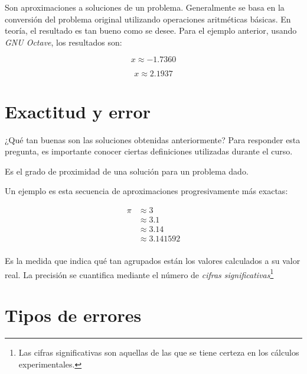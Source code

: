 Son aproximaciones a soluciones de un problema. Generalmente se basa en
la conversión del problema original utilizando operaciones aritméticas
básicas. En teoría, el resultado es tan bueno como se desee. Para el
ejemplo anterior, usando \emph{GNU Octave}, los resultados son:

\begin{equation*}{
        x \approx -1.7360
}\end{equation*}

\begin{equation*}{
        x \approx 2.1937
}\end{equation*}

\section{Exactitud y error}

¿Qué tan buenas son las soluciones obtenidas anteriormente? Para
responder esta pregunta, es importante conocer ciertas definiciones
utilizadas durante el curso.

\begin{definition}[Exactitud]
    Es el grado de proximidad de una solución para un problema dado.


\end{definition}

\begin{eg}
    Un ejemplo es esta secuencia de aproximaciones progresivamente más exactas:

    \begin{align*} 
        \pi &\approx 3 \\ 
            &\approx 3.1 \\ 
            &\approx 3.14 \\ 
            &\approx 3.141592 \\ 
    \end{align*}

\end{eg}

\begin{definition}[Precisión]
    Es la medida que indica qué tan agrupados están los valores calculados a
    su valor real. La precisión se cuantifica mediante el número de
    \emph{cifras significativas}\footnote{Las cifras significativas son
    aquellas de las que se tiene certeza en los cálculos experimentales.}
\end{definition}


\section{Tipos de errores}

